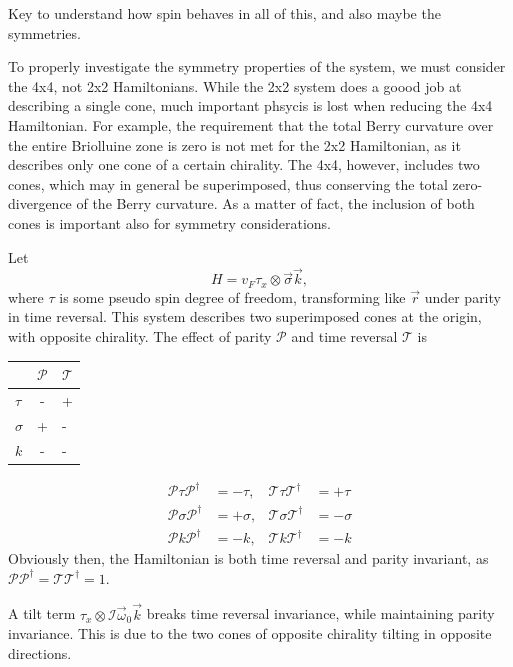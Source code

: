 Key to understand how spin behaves in all of this, and also maybe the symmetries.

To properly investigate the symmetry properties of the system, we must consider the 4x4, not 2x2 Hamiltonians.
While the 2x2 system does a goood job at describing a single cone, much important phsycis is lost when reducing the 4x4 Hamiltonian.
For example, the requirement that the total Berry curvature over the entire Briolluine zone is zero is not met for the 2x2 Hamiltonian, as it describes only one cone of a certain chirality.
The 4x4, however, includes two cones, which may in general be superimposed, thus conserving the total zero-divergence of the Berry curvature.
As a matter of fact, the inclusion of both cones is important also for symmetry considerations.

Let
\[
  H = v_{F} \tau _{x} \otimes \vec{\sigma} \vec{k},
\]
where \(\tau \) is some pseudo spin degree of freedom, transforming like \(\vec{r}\) under parity in time reversal.
This system describes two superimposed cones at the origin, with opposite chirality.
The effect of parity \(\mathcal{P}\) and time reversal \(\mathcal{T}\) is
\begin{table}[h]
  \centering
  \begin{tabular}{LC}
    & \(\mathcal{P}\) & \(\mathcal{T}\)\\
    \hline
    \(\tau \) & - & +\\
    \(\sigma \) & + & -\\
    \(k\) & - & -
  \end{tabular}
\end{table}
\begin{equation}
  \label{eq:26}
  \begin{aligned}
    \mathcal{P} \tau \mathcal{P}^{\dagger} &= -\tau, & \mathcal{T} \tau \mathcal{T}^{\dagger} &= +\tau\\
    \mathcal{P} \sigma  \mathcal{P}^{\dagger} &= + \sigma,  & \mathcal{T} \sigma  \mathcal{T}^{\dagger} &= -\sigma \\
    \mathcal{P} k \mathcal{P}^{\dagger} &= -k, & \mathcal{T} k \mathcal{T}^{\dagger} &= -k
  \end{aligned}
\end{equation}
Obviously then, the Hamiltonian is both time reversal and parity invariant, as \(\mathcal{P} \mathcal{P}^{\dagger} = \mathcal{T} \mathcal{T}^{\dagger} = 1\).

A tilt term \(\tau _{x} \otimes \mathcal{I} \vec{\omega} _{0} \vec{k}\) breaks time reversal invariance, while maintaining parity invariance.
This is due to the two cones of opposite chirality tilting in opposite directions.

